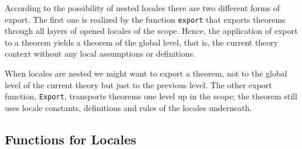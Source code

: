 According to the possibility of nested locales there are two different forms
of export.  The first one is realized by the function \texttt{export} that
exports theorems through all layers of opened locales of the scope.  Hence,
the application of export to a theorem yields a theorem of the global level,
that is, the current theory context without any local assumptions or
definitions.

When locales are nested we might want to export a theorem, not to the global
level of the current theory but just to the previous level.  The other export
function, \texttt{Export}, transports theorems one level up in the scope; the
theorem still uses locale constants, definitions and rules of the locales
underneath.

\subsection{Functions for Locales}
\label{Syntax}

